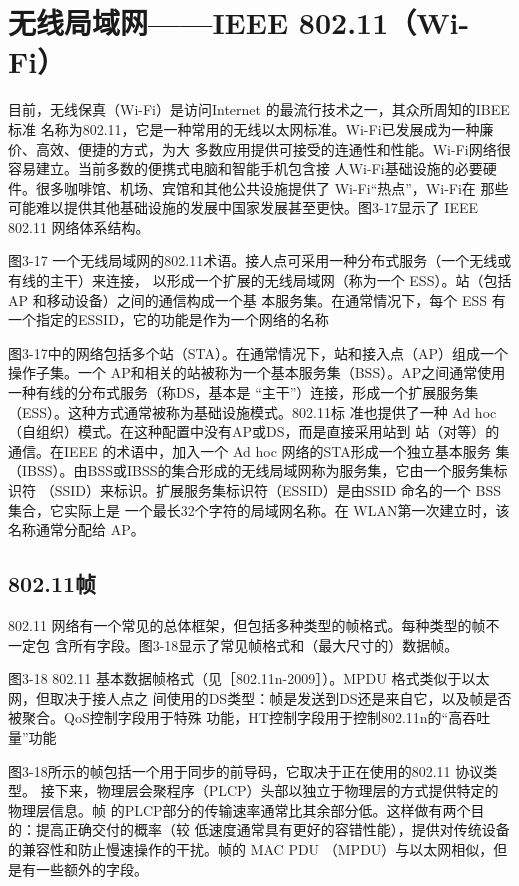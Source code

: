 \section{无线局域网——IEEE 802.11（Wi-Fi）}

目前，无线保真（Wi-Fi）是访问Internet 的最流行技术之一，其众所周知的IBEE 标准
名称为802.11，它是一种常用的无线以太网标准。Wi-Fi已发展成为一种廉价、高效、便捷的方式，为大
多数应用提供可接受的连通性和性能。Wi-Fi网络很容易建立。当前多数的便携式电脑和智能手机包含接
人Wi-Fi基础设施的必要硬件。很多咖啡馆、机场、宾馆和其他公共设施提供了 Wi-Fi“热点”，Wi-Fi在
那些可能难以提供其他基础设施的发展中国家发展甚至更快。图3-17显示了 IEEE 802.11 网络体系结构。

图3-17 一个无线局域网的802.11术语。接人点可采用一种分布式服务（一个无线或有线的主干）来连接，
以形成一个扩展的无线局域网（称为一个 ESS）。站（包括AP 和移动设备）之间的通信构成一个基
本服务集。在通常情况下，每个 ESS 有一个指定的ESSID，它的功能是作为一个网络的名称

图3-17中的网络包括多个站（STA）。在通常情况下，站和接入点（AP）组成一个操作子集。一个
AP和相关的站被称为一个基本服务集（BSS）。AP之间通常使用一种有线的分布式服务（称DS，基本是
“主干”）连接，形成一个扩展服务集（ESS）。这种方式通常被称为基础设施模式。802.11标
准也提供了一种 Ad hoc（自组织）模式。在这种配置中没有AP或DS，而是直接采用站到
站（对等）的通信。在IEEE 的术语中，加入一个 Ad hoc 网络的STA形成一个独立基本服务
集（IBSS）。由BSS或IBSS的集合形成的无线局域网称为服务集，它由一个服务集标识符
（SSID）来标识。扩展服务集标识符（ESSID）是由SSID 命名的一个 BSS集合，它实际上是
一个最长32个字符的局域网名称。在 WLAN第一次建立时，该名称通常分配给 AP。

\subsection{802.11帧}

802.11 网络有一个常见的总体框架，但包括多种类型的帧格式。每种类型的帧不一定包
含所有字段。图3-18显示了常见帧格式和（最大尺寸的）数据帧。

图3-18
802.11 基本数据帧格式（见［802.11n-2009］）。MPDU 格式类似于以太网，但取决于接人点之
间使用的DS类型：帧是发送到DS还是来自它，以及帧是否被聚合。QoS控制字段用于特殊
功能，HT控制字段用于控制802.11n的“高吞吐量”功能

图3-18所示的帧包括一个用于同步的前导码，它取决于正在使用的802.11 协议类型。
接下来，物理层会聚程序（PLCP）头部以独立于物理层的方式提供特定的物理层信息。帧
的PLCP部分的传输速率通常比其余部分低。这样做有两个目的：提高正确交付的概率（较
低速度通常具有更好的容错性能），提供对传统设备的兼容性和防止慢速操作的干扰。帧的
MAC PDU （MPDU）与以太网相似，但是有一些额外的字段。


